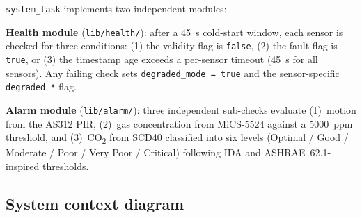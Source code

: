 \documentclass[11pt,a4paper]{article}
\begin{document}
\texttt{system\_task} implements two independent modules:

\textbf{Health module} (\texttt{lib/health/}): after a 45~s cold-start window, each sensor
is checked for three conditions: (1) the validity flag is \texttt{false}, (2) the fault flag is
\texttt{true}, or (3) the timestamp age exceeds a per-sensor timeout (45~s for all sensors).
Any failing check sets \texttt{degraded\_mode = true} and the sensor-specific \texttt{degraded\_*}
flag.

\textbf{Alarm module} (\texttt{lib/alarm/}): three independent sub-checks evaluate
(1)~motion from the AS312 PIR, (2)~gas concentration from MiCS-5524 against a 5000~ppm threshold,
and (3)~CO\textsubscript{2} from SCD40 classified into six levels (Optimal / Good / Moderate /
Poor / Very Poor / Critical) following IDA and ASHRAE~62.1-inspired thresholds.

\subsection{System context diagram}
\vspace{5pt}
\end{document}
